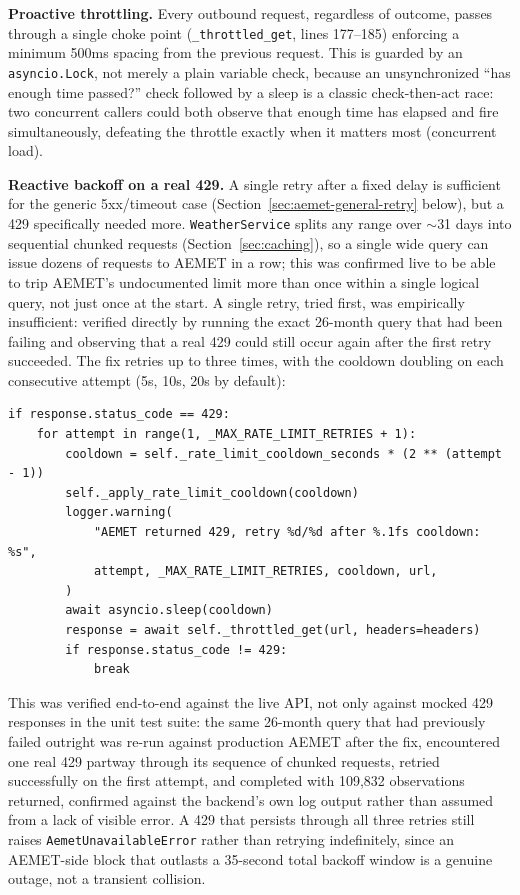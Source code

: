 \documentclass[11pt,a4paper]{article}
\begin{document}
\textbf{Proactive throttling.} Every outbound request, regardless of
outcome, passes through a single choke point
(\texttt{\_throttled\_get}, lines 177--185) enforcing a minimum 500ms
spacing from the previous request. This is guarded by an
\texttt{asyncio.Lock}, not merely a plain variable check, because an
unsynchronized ``has enough time passed?'' check followed by a sleep is a
classic check-then-act race: two concurrent callers could both observe
that enough time has elapsed and fire simultaneously, defeating the
throttle exactly when it matters most (concurrent load).

\textbf{Reactive backoff on a real 429.} A single retry after a fixed delay
is sufficient for the generic 5xx/timeout case (Section~\ref{sec:aemet-general-retry}
below), but a 429 specifically needed more. \texttt{WeatherService} splits
any range over $\sim$31 days into sequential chunked requests
(Section~\ref{sec:caching}), so a single wide query can issue dozens of
requests to AEMET in a row; this was confirmed live to be able to trip
AEMET's undocumented limit more than once within a single logical query,
not just once at the start. A single retry, tried first, was empirically
insufficient: verified directly by running the exact 26-month query that
had been failing and observing that a real 429 could still occur again
after the first retry succeeded. The fix retries up to three times, with
the cooldown doubling on each consecutive attempt (5s, 10s, 20s by
default):

\begin{lstlisting}[caption={Multi-retry 429 handling with a doubling cooldown. \texttt{backend/app/integrations/aemet/client.py}, lines 146--167.}]
if response.status_code == 429:
    for attempt in range(1, _MAX_RATE_LIMIT_RETRIES + 1):
        cooldown = self._rate_limit_cooldown_seconds * (2 ** (attempt - 1))
        self._apply_rate_limit_cooldown(cooldown)
        logger.warning(
            "AEMET returned 429, retry %d/%d after %.1fs cooldown: %s",
            attempt, _MAX_RATE_LIMIT_RETRIES, cooldown, url,
        )
        await asyncio.sleep(cooldown)
        response = await self._throttled_get(url, headers=headers)
        if response.status_code != 429:
            break
\end{lstlisting}

This was verified end-to-end against the live API, not only against mocked
429 responses in the unit test suite: the same 26-month query that had
previously failed outright was re-run against production AEMET after the
fix, encountered one real 429 partway through its sequence of chunked
requests, retried successfully on the first attempt, and completed with
109{,}832 observations returned, confirmed against the backend's own log
output rather than assumed from a lack of visible error. A 429 that
persists through all three retries still raises
\texttt{AemetUnavailableError} rather than retrying indefinitely, since an
AEMET-side block that outlasts a 35-second total backoff window is a
genuine outage, not a transient collision.
\end{document}
